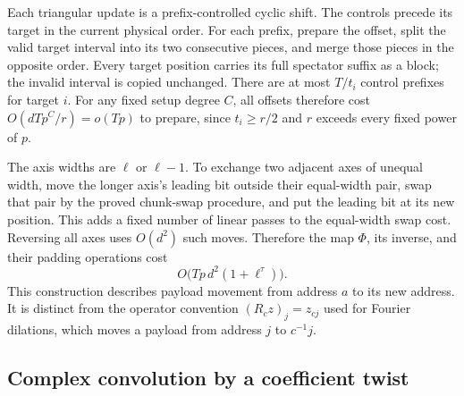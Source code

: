 Each triangular update is a prefix-controlled cyclic shift.  The
controls precede its target in the current physical order.  For each
prefix, prepare the offset, split the valid target interval into its
two consecutive pieces, and merge those pieces in the opposite order.
Every target position carries its full spectator suffix as a block;
the invalid interval is copied unchanged.  There are at most $T/t_i$
control prefixes for target $i$.  For any fixed setup degree $C$, all
offsets therefore cost $O(dTp^C/r)=o(Tp)$ to prepare, since
$t_i\ge r/2$ and $r$ exceeds every fixed power of $p$.

The axis widths are $\ell$ or $\ell-1$.  To exchange two adjacent axes
of unequal width, move the longer axis's leading bit outside their
equal-width pair, swap that pair by the proved chunk-swap procedure,
and put the leading bit at its new position.  This adds a fixed number
of linear passes to the equal-width swap cost.  Reversing all axes
uses $O(d^2)$ such moves.  Therefore the map $\Phi$, its inverse, and
their padding operations cost
\[
 O\bigl(Tp\,d^2(1+\ell^\tau)\bigr).
\]
This construction describes payload movement from address $a$ to its
new address.  It is distinct from the operator convention
$(R_cz)_j=z_{cj}$ used for Fourier dilations, which moves a payload
from address $j$ to $c^{-1}j$.

\subsection{Complex convolution by a coefficient twist}

